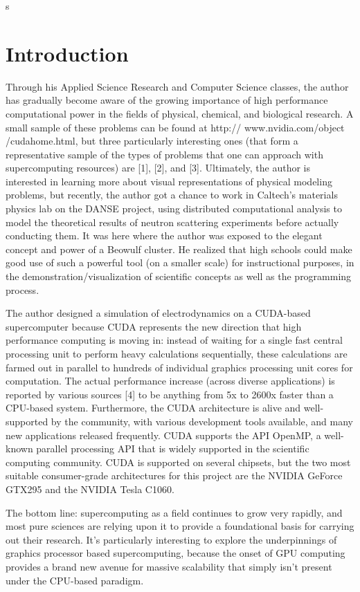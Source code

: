 s\documentclass[10pt]{article}
\begin{document}
\section{Introduction} %
Through his Applied Science Research and Computer Science classes, the author has gradually become aware of the growing importance of high performance computational power in the fields of physical, chemical, and biological research. A small sample of these problems can be found at http:// www.nvidia.com/object /cudahome.html, but three particularly interesting ones (that form a representative sample of the types of problems that one can approach with supercomputing resources) are [1], [2], and [3]. Ultimately, the author is interested in learning more about visual representations of physical modeling problems, but recently, the author got a chance to work in Caltech's materials physics lab on the DANSE project, using distributed computational analysis to model the theoretical results of neutron scattering experiments before actually conducting them. It was here where the author was exposed to the elegant concept and power of a Beowulf cluster. He realized that high schools could make good use of such a powerful tool (on a smaller scale) for instructional purposes, in the demonstration/visualization of scientific concepts as well as the programming process.

The author designed a simulation of electrodynamics on a CUDA-based supercomputer because CUDA represents the new direction that high performance computing is moving in: instead of waiting for a single fast central processing unit to perform heavy calculations sequentially, these calculations are farmed out in parallel to hundreds of individual graphics processing unit cores for computation. The actual performance increase (across diverse applications) is reported by various sources [4] to be anything from 5x to 2600x faster than a CPU-based system. Furthermore, the CUDA architecture is alive and well-supported by the community, with various development tools available, and many new applications released frequently. CUDA supports the API OpenMP, a well-known parallel processing API that is widely supported in the scientific computing community. CUDA is supported on several chipsets, but the two most suitable consumer-grade architectures for this project are the NVIDIA GeForce GTX295 and the NVIDIA Tesla C1060. 

The bottom line: supercomputing as a field continues to grow very rapidly, and most pure sciences are relying upon it to provide a foundational basis for carrying out their research. It's particularly interesting to explore the underpinnings of graphics processor based supercomputing, because the onset of GPU computing provides a brand new avenue for massive scalability that simply isn't present under the CPU-based paradigm.
\end{document}
